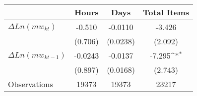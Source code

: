 {
\def\sym#1{\ifmmode^{#1}\else\(^{#1}\)\fi}
\begin{tabular}{l*{3}{c}}
\hline\hline
                    &\multicolumn{1}{c}{Hours}&\multicolumn{1}{c}{Days}&\multicolumn{1}{c}{Total Items}\\
\hline
$\Delta Ln(mw_{kt})$  &      -0.510         &     -0.0110         &      -3.426         \\
                    &     (0.706)         &    (0.0238)         &     (2.092)         \\
[1em]
$\Delta Ln(mw_{kt-1})$&     -0.0243         &     -0.0137         &      -7.295\sym{*}  \\
                    &     (0.897)         &    (0.0168)         &     (2.743)         \\
\hline
Observations        &       19373         &       19373         &       23217         \\
\hline\hline
\end{tabular}
}
